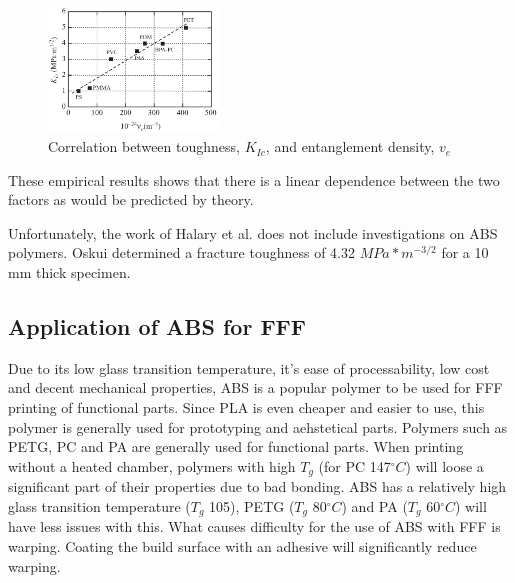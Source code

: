 \begin{figure}[H]
    \centering
    \includegraphics[width=0.4\textwidth]{chapter_2/figures/KIc.png}
    \caption{Correlation between toughness, $K_{Ic}$, and entanglement density, $v_e$  \cite{Halary2011PolymerMaterials}}
    \label{fig:stresscrack}
\end{figure}
These empirical results shows that there is a linear dependence  between the two factors as would be predicted by theory. 

Unfortunately, the work of Halary et al. does not include investigations on ABS polymers. 
Oskui \cite{Oskui2014ExperimentalDevice} determined a fracture toughness of 4.32 $MPa*m^{-3/2}$ for a 10 mm thick specimen. %


\subsection{Application of ABS for FFF}
\label{Application of ABS for FFF}
Due to its low glass transition temperature, it's ease of processability, low cost and decent mechanical properties, ABS is a popular polymer to be used for FFF printing of functional parts. Since PLA is even cheaper and easier to use, this polymer is generally used for prototyping and aehstetical parts. Polymers such as PETG, PC and PA are generally used for functional parts. When printing without a heated chamber, polymers with high $T_g$ (for PC 147$^\circ C$) will loose a significant part of their properties due to bad bonding. ABS has a relatively high glass transition temperature ($T_g$ 105), PETG ($T_g$ 80$^\circ C$) and PA ($T_g$ 60$^\circ C$) will have less issues with this. What causes difficulty for the use of ABS with FFF is warping. Coating the build surface with an adhesive will significantly reduce warping.


